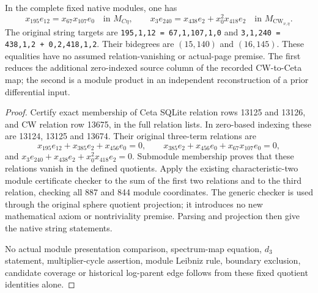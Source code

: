 \begin{lemma}
  \label{lem:lin-native-module-products}
  \leanok
  In the complete fixed native modules, one has
  \[
    x_{195}e_{12}=x_{67}x_{107}e_0
       \quad\text{in }M_{C\eta},
    \qquad
    x_3e_{240}=x_{438}e_2+x_0^2x_{418}e_2
       \quad\text{in }M_{\mathrm{CW}_{\nu,\eta}}.
  \]
  The original string targets are
  \texttt{195,1,12 = 67,1,107,1,0} and
  \texttt{3,1,240 = 438,1,2 + 0,2,418,1,2}.
  Their bidegrees are $(15,140)$ and $(16,145)$.
  These equalities have no assumed relation-vanishing or actual-page
  premise. The first reduces the additional zero-indexed source column
  of the recorded CW-to-Ceta map; the second is a module product in an
  independent reconstruction of a prior differential input.
\end{lemma}
\begin{proof}
  \leanok
  Certify exact membership of Ceta SQLite relation rows 13125 and
  13126, and CW relation row 13675, in the full relation lists.
  In zero-based indexing these are 13124, 13125 and 13674.
  Their original three-term relations are
  \[
    x_{195}e_{12}+x_{385}e_2+x_{456}e_0=0,
    \qquad
    x_{385}e_2+x_{456}e_0+x_{67}x_{107}e_0=0,
  \]
  and $x_3e_{240}+x_{438}e_2+x_0^2x_{418}e_2=0$.
  Submodule membership proves that these relations vanish in the
  defined quotients. Apply the existing characteristic-two module
  certificate checker to the sum of the first two relations and to
  the third relation, checking all 887 and 844 module coordinates.
  The generic checker is used through the original sphere quotient
  projection; it introduces no new mathematical axiom or nontriviality
  premise. Parsing and projection then give the native string statements.

  No actual module presentation comparison, spectrum-map equation,
  $d_3$ statement, multiplier-cycle assertion, module Leibniz rule,
  boundary exclusion, candidate coverage or historical log-parent edge
  follows from these fixed quotient identities alone.
\end{proof}

